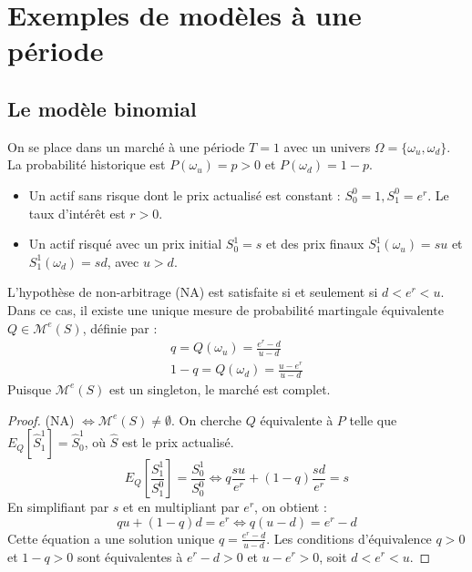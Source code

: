 \chapter{Exemples de modèles à une période}

\section{Le modèle binomial}
On se place dans un marché à une période $T=1$ avec un univers $\Omega = \{\omega_u, \omega_d\}$. La probabilité historique est $P(\omega_u)=p > 0$ et $P(\omega_d)=1-p$.
\begin{itemize}
    \item Un actif sans risque dont le prix actualisé est constant : $S_0^0 = 1, S_1^0 = e^r$. Le taux d'intérêt est $r > 0$.
    \item Un actif risqué avec un prix initial $S_0^1=s$ et des prix finaux $S_1^1(\omega_u) = su$ et $S_1^1(\omega_d) = sd$, avec $u > d$.
\end{itemize}

\begin{proposition}
L'hypothèse de non-arbitrage (NA) est satisfaite si et seulement si $d < e^r < u$.
Dans ce cas, il existe une unique mesure de probabilité martingale équivalente $Q \in \mathcal{M}^e(S)$, définie par :
\begin{align*}
    q = Q(\omega_u) = \frac{e^r - d}{u - d} \\
    1-q = Q(\omega_d) = \frac{u - e^r}{u - d}
\end{align*}
Puisque $\mathcal{M}^e(S)$ est un singleton, le marché est complet.
\end{proposition}

\begin{proof}
(NA) $\iff \mathcal{M}^e(S) \neq \emptyset$. On cherche $Q$ équivalente à $P$ telle que $E_Q[\hat{S}_1^1] = \hat{S}_0^1$, où $\hat{S}$ est le prix actualisé.
\begin{equation}
E_Q\left[\frac{S_1^1}{S_1^0}\right] = \frac{S_0^1}{S_0^0} \iff q \frac{su}{e^r} + (1-q) \frac{sd}{e^r} = s
\end{equation}
En simplifiant par $s$ et en multipliant par $e^r$, on obtient :
\begin{equation}
q u + (1-q) d = e^r \iff q(u-d) = e^r - d
\end{equation}
Cette équation a une solution unique $q = \frac{e^r - d}{u - d}$. Les conditions d'équivalence $q>0$ et $1-q>0$ sont équivalentes à $e^r-d>0$ et $u-e^r>0$, soit $d < e^r < u$.
\end{proof}

